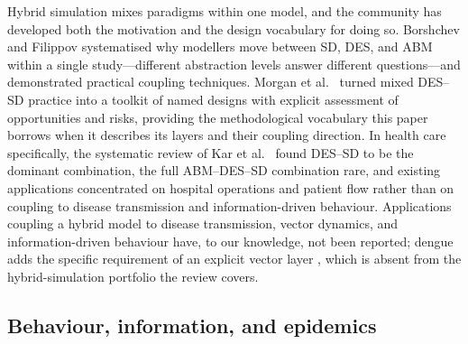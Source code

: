 \documentclass[]{interact}
\begin{document}
Hybrid simulation mixes paradigms within one model, and the community has developed both the motivation and the design vocabulary for doing so. Borshchev and Filippov \cite{borshchev2004system} systematised why modellers move between SD, DES, and ABM within a single study---different abstraction levels answer different questions---and demonstrated practical coupling techniques. Morgan et al.\ \cite{morgan2017toolkit} turned mixed DES--SD practice into a toolkit of named designs with explicit assessment of opportunities and risks, providing the methodological vocabulary this paper borrows when it describes its layers and their coupling direction. In health care specifically, the systematic review of Kar et al.\ \cite{kar2025hybrid} found DES--SD to be the dominant combination, the full ABM--DES--SD combination rare, and existing applications concentrated on hospital operations and patient flow rather than on coupling to disease transmission and information-driven behaviour. Applications coupling a hybrid model to disease transmission, vector dynamics, and information-driven behaviour have, to our knowledge, not been reported; dengue adds the specific requirement of an explicit vector layer \cite{esteva1998analysis}, which is absent from the hybrid-simulation portfolio the review covers.

\subsection{Behaviour, information, and epidemics}
\end{document}

